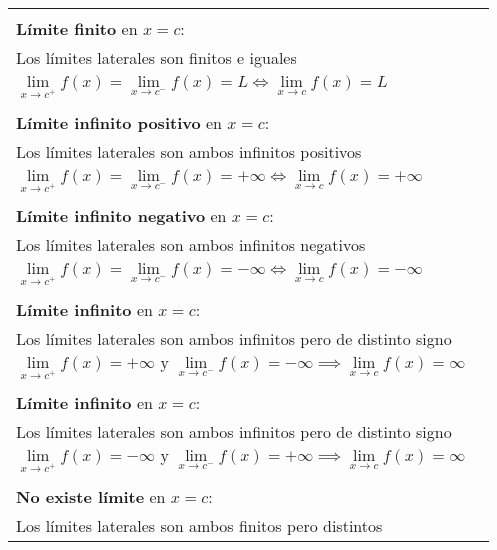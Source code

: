 \documentclass[12pt]{article}
\theoremstyle{definition}
\begin{document}
\begin{enumerate}
{\centering\footnotesize
\begin{longtable}{|p{}|p{}|}
\hline & \\
\textbf{Límite finito} en $x = c$: & \\
Los límites laterales son finitos e iguales \smallskip & \\
$\lim\limits_{x \to c^+} f(x) = \lim\limits_{x \to c^-} f(x) = L \iff \lim\limits_{x \to c} f(x) = L$ \vspace{2mm} & \\
\hline & \\
\textbf{Límite infinito positivo} en $x = c$: & \\
Los límites laterales son ambos infinitos positivos \smallskip & \\
$\lim\limits_{x \to c^+} f(x) = \lim\limits_{x \to c^-} f(x) = +\infty \iff \lim\limits_{x \to c} f(x) = +\infty$ \vspace{2mm} & \\
\hline & \\
\textbf{Límite infinito negativo} en $x = c$: & \\
Los límites laterales son ambos infinitos negativos \smallskip & \\
$\lim\limits_{x \to c^+} f(x) = \lim\limits_{x \to c^-} f(x) = -\infty \iff \lim\limits_{x \to c} f(x) = -\infty$ \vspace{2mm} & \\
\hline & \\
\textbf{Límite infinito} en $x = c$: & \\
Los límites laterales son ambos infinitos pero de distinto signo \smallskip & \\
$\lim\limits_{x \to c^+} f(x) = +\infty \text{ y } \lim\limits_{x \to c^-} f(x) = -\infty \implies \lim\limits_{x \to c} f(x) = \infty$ \vspace{2mm} & \\
\hline & \\
\textbf{Límite infinito} en $x = c$: & \\
Los límites laterales son ambos infinitos pero de distinto signo \smallskip & \\
$\lim\limits_{x \to c^+} f(x) = -\infty \text{ y } \lim\limits_{x \to c^-} f(x) = +\infty \implies \lim\limits_{x \to c} f(x) = \infty$ \vspace{2mm} & \\
\hline & \\
\textbf{No existe límite} en $x = c$: & \\
Los límites laterales son ambos finitos pero distintos \smallskip & \\

\end{longtable}}
\end{enumerate}
\end{document}
